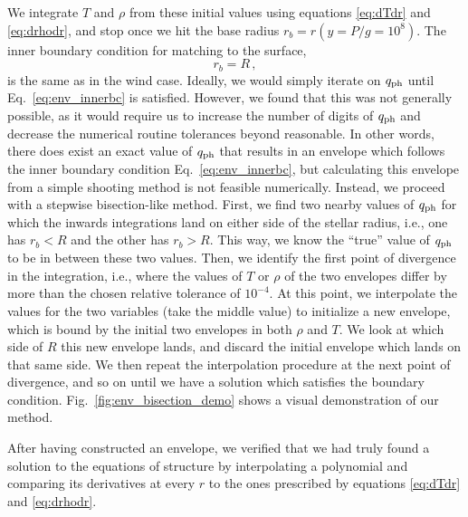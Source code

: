 \documentclass[../main.tex]{subfiles}
\begin{document}
We integrate $T$ and $\rho$ from these initial values using equations \eqref{eq:dTdr} and \eqref{eq:drhodr}, and stop once we hit the base radius $r_b=r(y=P/g=10^8)$. The inner boundary condition for matching to the surface,
\begin{equation}\label{eq:env_innerbc}
    r_b=R\,,
\end{equation}
is the same as in the wind case. Ideally, we would simply iterate on $q_\text{ph}$ until Eq.~\eqref{eq:env_innerbc} is satisfied. However, we found that this was not generally possible, as it would require us to increase the number of digits of $q_\text{ph}$ and decrease the numerical routine tolerances beyond reasonable. In other words, there does exist an exact value of $q_\text{ph}$ that results in an envelope which follows the inner boundary condition Eq.~\eqref{eq:env_innerbc}, but calculating this envelope from a simple shooting method is not feasible numerically. Instead, we proceed with a stepwise bisection-like method. First, we find two nearby values of $q_\text{ph}$  for which the inwards integrations land on either side of the stellar radius, i.e., one has $r_b<R$ and the other has $r_b>R$. This way, we know the ``true'' value of $q_\text{ph}$ to be in between these two values. Then, we identify the first point of divergence in the integration, i.e., where the values of $T$ or $\rho$ of the two envelopes differ by more than the chosen relative tolerance of $10
^{-4}$. At this point, we interpolate the values for the two variables (take the middle value) to initialize a new envelope, which is bound by the initial two envelopes in both $\rho$ and $T$. We look at which side of $R$ this new envelope lands, and discard the initial envelope which lands on that same side. We then repeat the interpolation procedure at the next point of divergence, and so on until we have a solution which satisfies the boundary condition. Fig.~\ref{fig:env_bisection_demo} shows a visual demonstration of our method. 

After having constructed an envelope, we verified that we had truly found a solution to the equations of structure by interpolating a polynomial and comparing its derivatives at every $r$ to the ones prescribed by equations \eqref{eq:dTdr} and \eqref{eq:drhodr}.
\end{document}

